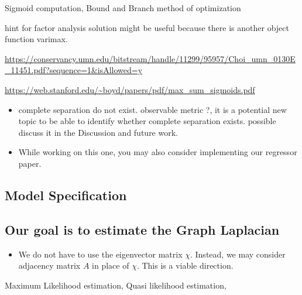 \documentclass[
]{article}
\providecommand{\tightlist}{%
  \setlength{\itemsep}{0pt}\setlength{\parskip}{0pt}}
\begin{document}
Sigmoid computation, Bound and Branch method of optimization

hint for factor analysis solution might be useful because there is
another object function varimax.

\url{https://conservancy.umn.edu/bitstream/handle/11299/95957/Choi_umn_0130E_11451.pdf?sequence=1\&isAllowed=y}

\url{https://web.stanford.edu/~boyd/papers/pdf/max_sum_sigmoids.pdf}

\begin{itemize}
\item
  complete separation do not exist. observable metric ?, it is a
  potential new topic to be able to identify whether complete separation
  exists. possible discuss it in the Discussion and future work.
\item
  While working on this one, you may also consider implementing our
  regressor paper.
\end{itemize}

\hypertarget{model-specification}{%
\subsection{Model Specification}\label{model-specification}}

\hypertarget{our-goal-is-to-estimate-the-graph-laplacian}{%
\subsection{Our goal is to estimate the Graph
Laplacian}\label{our-goal-is-to-estimate-the-graph-laplacian}}

\begin{itemize}
\tightlist
\item
  We do not have to use the eigenvector matrix \(\chi\). Instead, we may
  consider adjacency matrix \(A\) in place of \(\chi\). This is a viable
  direction.
\end{itemize}

Maximum Likelihood estimation, Quasi likelihood estimation,
\end{document}
